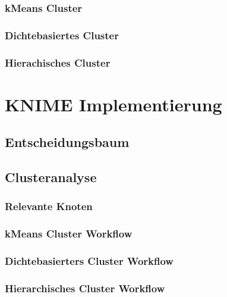 \documentclass[12pt,					%
							 oneside,			%
							 a4paper,			%
							 halfparskip,		%
							 liststotoc,			%
							 bibtotoc,			%
							 fleqn,				%
							 pointlessnumbers]	%
							 {scrreprt}
\begin{document}
\subsection{kMeans Cluster}
\subsection{Dichtebasiertes Cluster}
\subsection{Hierachisches Cluster}

\chapter{KNIME Implementierung}

\section{Entscheidungsbaum}

\section{Clusteranalyse}
\subsection{Relevante Knoten}
\subsection{kMeans Cluster Workflow}
\subsection{Dichtebasierters Cluster Workflow}
\subsection{Hierarchisches Cluster Workflow}

	
	
	\nocite{*}						%
	
\end{document}
